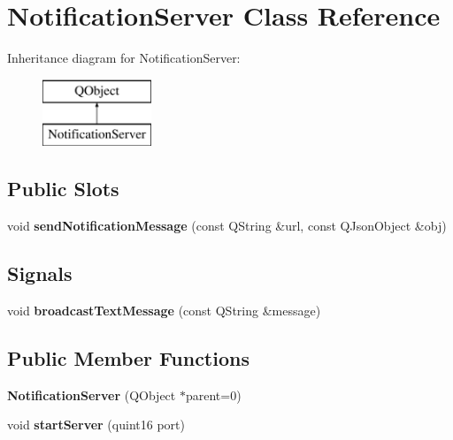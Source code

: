 \hypertarget{class_notification_server}{}\section{Notification\+Server Class Reference}
\label{class_notification_server}
Inheritance diagram for Notification\+Server\+:\begin{figure}[H]
\begin{center}
\leavevmode
\includegraphics[height=2.000000cm]{class_notification_server}
\end{center}
\end{figure}
\subsection*{Public Slots}
\begin{DoxyCompactItemize}
\item 
\mbox{\label{class_notification_server_ac03c2516a2b5b3c8473f9d3f2681944d}} 
void {\bfseries send\+Notification\+Message} (const Q\+String \&url, const Q\+Json\+Object \&obj)
\end{DoxyCompactItemize}
\subsection*{Signals}
\begin{DoxyCompactItemize}
\item 
\mbox{\label{class_notification_server_afd67abdb7fcb7a06878e85a3f9f203b2}} 
void {\bfseries broadcast\+Text\+Message} (const Q\+String \&message)
\end{DoxyCompactItemize}
\subsection*{Public Member Functions}
\begin{DoxyCompactItemize}
\item 
\mbox{\label{class_notification_server_a02f5762b8e41d1677163d13805d47906}} 
{\bfseries Notification\+Server} (Q\+Object $\ast$parent=0)
\item 
\mbox{\label{class_notification_server_a5e3a7df82c765939764c64a31339658e}} 
void {\bfseries start\+Server} (quint16 port)
\end{DoxyCompactItemize}
